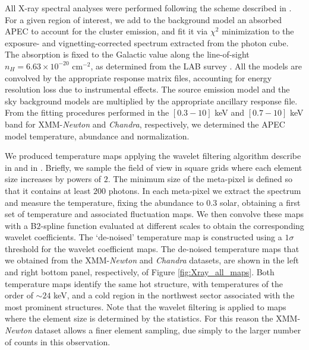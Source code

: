 \documentclass[twocolumn,traditabstract]{aa}
\begin{document}
All X-ray spectral analyses were performed following the scheme described in \cite{bourdin2008}. For a given region of interest, we add to the background model an absorbed APEC to account for the cluster emission, and fit it via $\chi^{2}$ minimization to the exposure- and vignetting-corrected spectrum extracted from the photon cube. The absorption is fixed to the Galactic value along the line-of-sight $n_{H} = 6.63 \times 10^{-20}$ cm$^{-2}$, as determined from the LAB survey \cite{kalberla2005}. All the models are convolved by the appropriate response matrix files, accounting for energy resolution loss due to instrumental effects. The source emission model and the sky background models are multiplied by the appropriate ancillary response file. From the fitting procedures performed in the $[0.3-10]$ keV and $[0.7-10]$ keV band for XMM-\textit{Newton} and \textit{Chandra}, respectively, we determined the APEC model temperature, abundance and normalization. 

We produced temperature maps applying the wavelet filtering algorithm describe in \cite{bourdin2004} and in \cite{bourdin2008}. Briefly, we sample the field of view in square grids where each element size increases by powers of $2$. The minimum size of the meta-pixel is defined so that it contains at least $200$ photons. In each meta-pixel we extract the spectrum and measure the temperature, fixing the abundance to $0.3$ solar, obtaining a first set of temperature and associated fluctuation maps. We then convolve these maps with a B$2$-spline function evaluated at different scales to obtain the corresponding wavelet coefficients. The `de-noised' temperature map is constructed using a $1\sigma$ threshold for the wavelet coefficient maps. The de-noised temperature maps that we obtained from the XMM-\textit{Newton} and \textit{Chandra} datasets, are shown in the left and right bottom panel, respectively, of Figure \ref{fig:Xray_all_maps}. Both temperature maps identify the same hot structure, with temperatures of the order of $\sim 24$ keV, and a cold region in the northwest sector associated with the most prominent structures. Note that the wavelet filtering is applied to maps where the element size is determined by the statistics. For this reason the XMM-\textit{Newton} dataset allows a finer element sampling, due simply to the larger number of counts in this observation.
\end{document}
